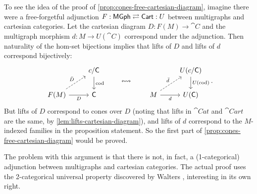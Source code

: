 \documentclass[11pt]{article}
\numberwithin{equation}{section}
\begin{document}
To see the idea of the proof of \cref{prop:cones-free-cartesian-diagram}, imagine
there were a free-forgetful adjunction
$F: \mathsf{MGph} \rightleftarrows \mathsf{Cart}: U$ between multigraphs and cartesian
categories. Let the cartesian diagram $D: F(M) \to \cat{C}$ and the multigraph
morphism $d: M \to U(\cat{C})$ correspond under the adjunction. Then naturality
of the hom-set bijections \cite[\mbox{Lemma 4.1.3}]{riehl2016} implies that
lifts of $D$ and lifts of $d$ correspond bijectively:
\begin{equation*}
  \begin{tikzcd}
    & {c/\cat{C}} \\
    {F(M)} & {\cat{C}}
    \arrow["\cod", from=1-2, to=2-2]
    \arrow["{\bar D}", dashed, from=2-1, to=1-2]
    \arrow["D"', from=2-1, to=2-2]
  \end{tikzcd}
  \qquad\leftrightsquigarrow\qquad
  \begin{tikzcd}
    & {U(c/\cat{C})} \\
    M & {U(\cat{C})}
    \arrow["{U(\cod)}", from=1-2, to=2-2]
    \arrow["{\bar d}", dashed, from=2-1, to=1-2]
    \arrow["d"', from=2-1, to=2-2]
  \end{tikzcd}.
\end{equation*}
But lifts of $D$ correspond to cones over $D$ (noting that lifts in $\cat{Cat}$
and $\cat{Cart}$ are the same, by \cref{lem:lifts-cartesian-diagram}), and lifts
of $d$ correspond to the $M$-indexed families in the proposition statement. So the
first part of \cref{prop:cones-free-cartesian-diagram} would be proved.

The problem with this argument is that there is not, in fact, a (1-categorical)
adjunction between multigraphs and cartesian categories. The actual proof uses
the 2-categorical universal property discovered by Walters \cite{walters1989},
interesting in its own right.
\end{document}
